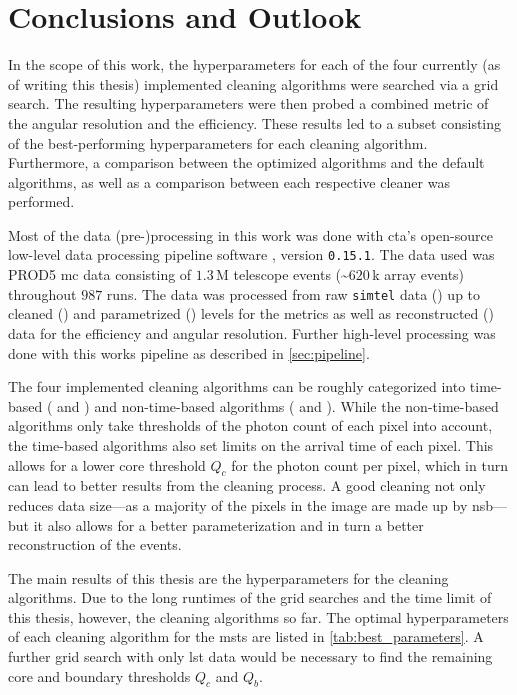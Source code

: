\chapter{Conclusions and Outlook}
\label{ch:conclusions}

In the scope of this work, the hyperparameters for each of the four currently (as of writing this thesis)
implemented cleaning algorithms were searched via a grid search. The resulting hyperparameters were then
probed \wrt a combined metric of the angular resolution and the efficiency. These results led to a subset
consisting of the best-performing hyperparameters for each cleaning algorithm. Furthermore, a comparison between the
optimized algorithms and the default algorithms, as well as a comparison between each respective
cleaner was performed.

Most of the data (pre-)processing in this work was done with \gls{cta}'s open-source low-level data processing pipeline
software \ctapipe{}, version \texttt{0.15.1}. The data used was PROD5 \gls{mc} data consisting of
\(\num{1.3}\)\,M telescope events (\sim\(\num{620}\)\,k array events) throughout \(987\) runs. The data
was processed from raw \texttt{simtel} data (\rzero) up to cleaned (\dloa) and parametrized (\dlob) levels
for the metrics as well as reconstructed (\dlt) data for the efficiency and angular resolution.
Further high-level processing was done with this works pipeline as described in \autoref{sec:pipeline}.

The four implemented cleaning algorithms can be roughly categorized into time-based (\fact{} and \tcc) and non-time-based
algorithms (\tailcuts{} and \mars{}). While the non-time-based algorithms only take thresholds of the photon count of each pixel
into account, the time-based algorithms also set limits on the arrival time of each pixel. This allows
for a lower core threshold \(Q_c\) for the photon count per pixel, which in turn can lead to better
results from the cleaning process. A good cleaning not only reduces data size---as a majority of the
pixels in the image are made up by \gls{nsb}---but it also allows for a better parameterization and in turn
a better reconstruction of the events.

The main results of this thesis are the hyperparameters for the cleaning algorithms.
Due to the long runtimes of the grid searches and the time limit of this thesis, however, the cleaning
algorithms so far. The optimal hyperparameters of each cleaning algorithm for
the \glspl{mst} are listed in \autoref{tab:best_parameters}. A further grid search with only \gls{lst}
data would be necessary to find the remaining core and boundary thresholds \(Q_c\) and \(Q_b\).

